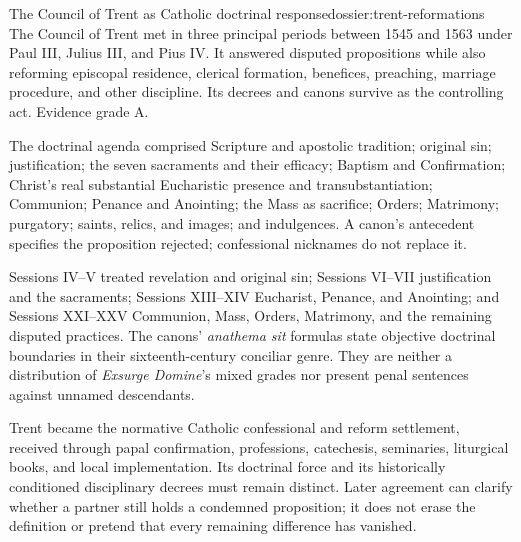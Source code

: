 \begin{heresydossier}{The Council of Trent as Catholic doctrinal response}{dossier:trent-reformations}
\objectfield The Council of Trent met in three principal periods between 1545 and 1563 under Paul III, Julius III, and Pius IV. It answered disputed propositions while also reforming episcopal residence, clerical formation, benefices, preaching, marriage procedure, and other discipline. Its decrees and canons survive as the controlling act. Evidence grade A.

\propositionfield The doctrinal agenda comprised Scripture and apostolic tradition; original sin; justification; the seven sacraments and their efficacy; Baptism and Confirmation; Christ's real substantial Eucharistic presence and transubstantiation; Communion; Penance and Anointing; the Mass as sacrifice; Orders; Matrimony; purgatory; saints, relics, and images; and indulgences. A canon's antecedent specifies the proposition rejected; confessional nicknames do not replace it.

\responsefield Sessions IV--V treated revelation and original sin; Sessions VI--VII justification and the sacraments; Sessions XIII--XIV Eucharist, Penance, and Anointing; and Sessions XXI--XXV Communion, Mass, Orders, Matrimony, and the remaining disputed practices. The canons' \emph{anathema sit} formulas state objective doctrinal boundaries in their sixteenth-century conciliar genre. They are neither a distribution of \emph{Exsurge Domine}'s mixed grades nor present penal sentences against unnamed descendants.

\aftermathfield Trent became the normative Catholic confessional and reform settlement, received through papal confirmation, professions, catechesis, seminaries, liturgical books, and local implementation. Its doctrinal force and its historically conditioned disciplinary decrees must remain distinct. Later agreement can clarify whether a partner still holds a condemned proposition; it does not erase the definition or pretend that every remaining difference has vanished.
\end{heresydossier}


